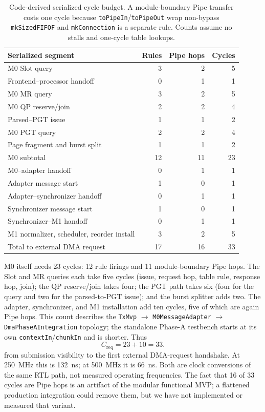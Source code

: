 \begin{table}[H]
  \centering
  \caption{Code-derived serialized cycle budget.  A module-boundary Pipe
  transfer costs one cycle because \texttt{toPipeIn}/\texttt{toPipeOut} wrap
  non-bypass \texttt{mkSizedFIFOF} and \texttt{mkConnection} is a separate rule.
  Counts assume no stalls and one-cycle table lookups.}
  \label{tab:eval:submission-stages}
  \footnotesize
  \begin{tabular}{@{}p{}rrr@{}}
    \toprule
    Serialized segment & Rules & Pipe hops & Cycles \\
    \midrule
    M0 Slot query & 3 & 2 & 5 \\
    Frontend--processor handoff & 0 & 1 & 1 \\
    M0 MR query & 3 & 2 & 5 \\
    M0 QP reserve/join & 2 & 2 & 4 \\
    Parsed--PGT issue & 1 & 1 & 2 \\
    M0 PGT query & 2 & 2 & 4 \\
    Page fragment and burst split & 1 & 1 & 2 \\
    \midrule
    M0 subtotal & 12 & 11 & 23 \\
    \midrule
    M0--adapter handoff & 0 & 1 & 1 \\
    Adapter message start & 1 & 0 & 1 \\
    Adapter--synchronizer handoff & 0 & 1 & 1 \\
    Synchronizer message start & 1 & 0 & 1 \\
    Synchronizer--M1 handoff & 0 & 1 & 1 \\
    M1 normalizer, scheduler, reorder install & 3 & 2 & 5 \\
    \midrule
    Total to external DMA request & 17 & 16 & 33 \\
    \bottomrule
  \end{tabular}
\end{table}

M0 itself needs 23 cycles: 12 rule firings and 11 module-boundary Pipe hops.
The Slot and MR queries each take five cycles (issue, request hop, table rule,
response hop, join); the QP reserve/join takes four; the PGT path takes six
(four for the query and two for the parsed-to-PGT issue); and the burst
splitter adds two.  The adapter, synchronizer, and M1 installation add ten
cycles, five of which are again Pipe hops.  This count describes the
\texttt{TxMvp} $\rightarrow$ \texttt{M0MessageAdapter} $\rightarrow$
\texttt{DmaPhaseAIntegration} topology; the standalone Phase-A testbench starts
at its own \texttt{contextIn}/\texttt{chunkIn} and is shorter.  Thus
\begin{equation}
  C_{\mathrm{req}} = 23 + 10 = 33.
\end{equation}
from submission visibility to the first external DMA-request handshake.  At
250~MHz this is 132~ns; at 500~MHz it is 66~ns.  Both are clock conversions of
the same RTL path, not measured operating frequencies.  The fact that 16 of 33
cycles are Pipe hops is an artifact of the modular functional MVP; a flattened
production integration could remove them, but we have not implemented or
measured that variant.

